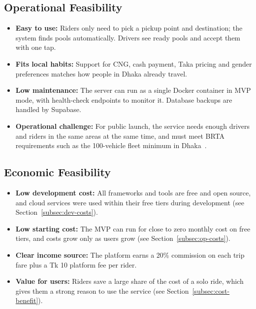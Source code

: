 \subsection{Operational Feasibility}

\begin{itemize}
  \item \textbf{Easy to use:} Riders only need to pick a pickup point and
        destination; the system finds pools automatically. Drivers see ready
        pools and accept them with one tap.
  \item \textbf{Fits local habits:} Support for CNG, cash payment, Taka pricing
        and gender preferences matches how people in Dhaka already travel.
  \item \textbf{Low maintenance:} The server can run as a single Docker
        container in MVP mode, with health-check endpoints to monitor it.
        Database backups are handled by Supabase.
  \item \textbf{Operational challenge:} For public launch, the service needs
        enough drivers and riders in the same areas at the same time, and must
        meet BRTA requirements such as the 100-vehicle fleet minimum in
        Dhaka~\cite{rideshare_guideline}.
\end{itemize}

\subsection{Economic Feasibility}

\begin{itemize}
  \item \textbf{Low development cost:} All frameworks and tools are free and
        open source, and cloud services were used within their free tiers
        during development (see Section~\ref{subsec:dev-costs}).
  \item \textbf{Low starting cost:} The MVP can run for close to zero monthly
        cost on free tiers, and costs grow only as users grow (see
        Section~\ref{subsec:op-costs}).
  \item \textbf{Clear income source:} The platform earns a 20\% commission on
        each trip fare plus a Tk 10 platform fee per rider.
  \item \textbf{Value for users:} Riders save a large share of the cost of a
        solo ride, which gives them a strong reason to use the service (see
        Section~\ref{subsec:cost-benefit}).
\end{itemize}


